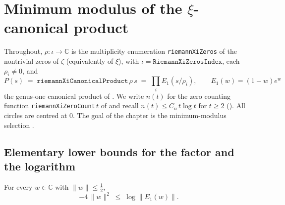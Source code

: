 %
%
%
%

\chapter{Minimum modulus of the \texorpdfstring{$\xi$}{xi}-canonical product}
\label{cha:cartan}

Throughout, $\rho\colon\iota\to\mathbb C$ is the multiplicity enumeration
\texttt{riemannXiZeros} of the nontrivial zeros of $\zeta$ (equivalently of
$\xi$), with $\iota=\texttt{RiemannXiZerosIndex}$, each $\rho_i\neq0$, and
\[
  P(s)\;=\;\texttt{riemannXiCanonicalProduct}\,\rho\,s\;=\;\prod_i E_1(s/\rho_i),
  \qquad E_1(w)=(1-w)e^{w}
\]
the genus-one canonical product of . We write $n(t)$ for the zero
counting function \texttt{riemannXiZeroCount}\,$t$ of  and recall
$n(t)\le C_n\,t\log t$ for $t\ge2$ (). All circles are centred at
$0$. The goal of the chapter is the minimum-modulus selection .

\section{Elementary lower bounds for the factor and the logarithm}
\label{sec:cm_elem}

\begin{lemma}
\label{lem:cm_elem_lower}
\leanok
{}
For every $w\in\mathbb C$ with $\|w\|\le\tfrac12$,
\[
  -4\,\|w\|^{2}\;\le\;\log\|E_1(w)\|.
\]
\end{lemma}

